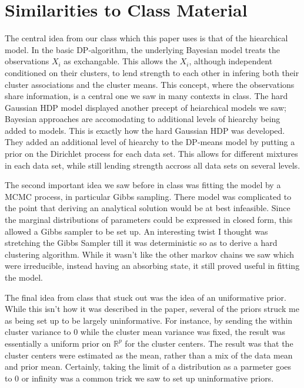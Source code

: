 \documentclass[11pt]{article}
\newcommand{\R}{\mathbb{R}}
\theoremstyle{definition}
\begin{document}
\section{Similarities to Class Material}
The central idea from our class which this paper uses is that of the hiearchical model. In the basic DP-algorithm, the underlying Bayesian model treats the observations $X_i$ as exchangable. This allows the $X_i$, although independent conditioned on their clusters, to lend strength to each other in infering both their cluster associations and the cluster means. This concept, where the observations share information, is a central one we saw in many contexts in class. The hard Gaussian HDP model displayed another precept of heiarchical models we saw; Bayesian approaches are accomodating to additional levels of hiearchy being added to models. This is exactly how the hard Gaussian HDP was developed. They added an additional level of hiearchy to the DP-means model by putting a prior on the Dirichlet process for each data set. This allows for different mixtures in each data set, while still lending strength accross all data sets on several levels.\par
The second important idea we saw before in class was fitting the model by a MCMC process, in particular Gibbs sampling. There model was complicated to the point that deriving an analytical solution would be at best infeasible. Since the marginal distributions of parameters could be expressed in closed form, this allowed a Gibbs sampler to be set up. An interesting twist I thought was stretching the Gibbs Sampler till it was deterministic so as to derive a hard clustering algorithm. While it wasn't like the other markov chains we saw which were irreducible, instead having an absorbing state, it still proved useful in fitting the model. \par
The final idea from class that stuck out was the idea of an uniformative prior. While this isn't how it was described in the paper, several of the priors struck me as being set up to be largely uninformative. For instance, by sending the within cluster variance to 0 while the cluster mean variance was fixed, the result was essentially a uniform prior on $\R^p$ for the cluster centers. The result was that the cluster centers were estimated as the mean, rather than a mix of the data mean and prior mean. Certainly, taking the limit of a distribution as a parmeter goes to 0 or infinity was a common trick we saw to set up uninformative priors.
\end{document}
